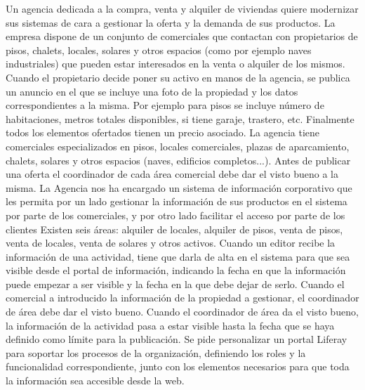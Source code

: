 \begin{center}
    \begin{minipage}{0.9\linewidth}
        \vspace{5pt}%
        {\small
        Un agencia dedicada a la compra, venta y alquiler de viviendas quiere modernizar sus
        sistemas de cara a gestionar la oferta y la demanda de sus productos.
        La empresa dispone de un conjunto de comerciales que contactan con propietarios de
        pisos, chalets, locales, solares y otros espacios (como por ejemplo naves industriales)
        que pueden estar interesados en la venta o alquiler de los mismos. Cuando el
        propietario decide poner su activo en manos de la agencia, se publica un anuncio en el
        que se incluye una foto de la propiedad y los datos correspondientes a la misma. Por
        ejemplo para pisos se incluye número de habitaciones, metros totales disponibles, si
        tiene garaje, trastero, etc. Finalmente todos los elementos ofertados tienen un precio
        asociado.
        La agencia tiene comerciales especializados en pisos, locales comerciales, plazas de
        aparcamiento, chalets, solares y otros espacios (naves, edificios completos...). Antes
        de publicar una oferta el coordinador de cada área comercial debe dar el visto bueno a
        la misma.
        La Agencia nos ha encargado un sistema de información corporativo que les permita
        por un lado gestionar la información de sus productos en el sistema por parte de los
        comerciales, y por otro lado facilitar el acceso por parte de los clientes
        Existen seis áreas: alquiler de locales, alquiler de pisos, venta de pisos, venta de
        locales, venta de solares y otros activos. Cuando un editor recibe la información de una
        actividad, tiene que darla de alta en el sistema para que sea visible desde el portal de
        información, indicando la fecha en que la información puede empezar a ser visible y la
        fecha en la que debe dejar de serlo.
        Cuando el comercial a introducido la información de la propiedad a gestionar, el
        coordinador de área debe dar el visto bueno. Cuando el coordinador de área da el
        visto bueno, la información de la actividad pasa a estar visible hasta la fecha que se
        haya definido como límite para la publicación.
        Se pide personalizar un portal Liferay para soportar los procesos de la organización,
        definiendo los roles y la funcionalidad correspondiente, junto con los elementos
        necesarios para que toda la información sea accesible desde la web.

}
\end{minipage}
\end{center}

